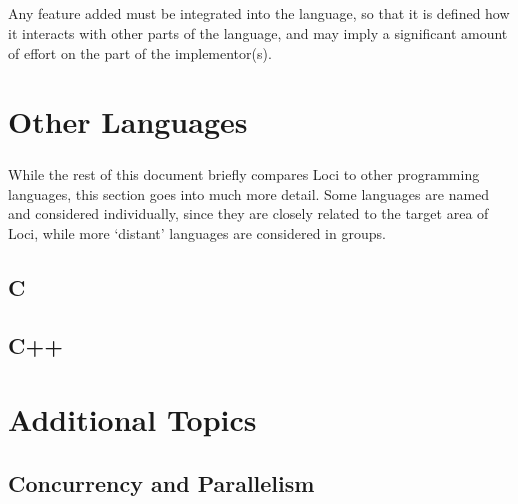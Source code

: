 \documentclass[12pt,twoside,notitlepage]{report}
\begin{document}
\paragraph{}
Any feature added must be integrated into the language, so that it is defined how it interacts with other parts of the language, and may imply a significant amount of effort on the part of the implementor(s).

\cleardoublepage

\chapter{Other Languages}

\paragraph{}
While the rest of this document briefly compares Loci to other programming languages, this section goes into much more detail. Some languages are named and considered individually, since they are closely related to the target area of Loci, while more `distant' languages are considered in groups.

\section{C}

\paragraph{}


\section{C++}

\paragraph{}


\cleardoublepage

\chapter{Additional Topics}

\section{Concurrency and Parallelism}
\end{document}
